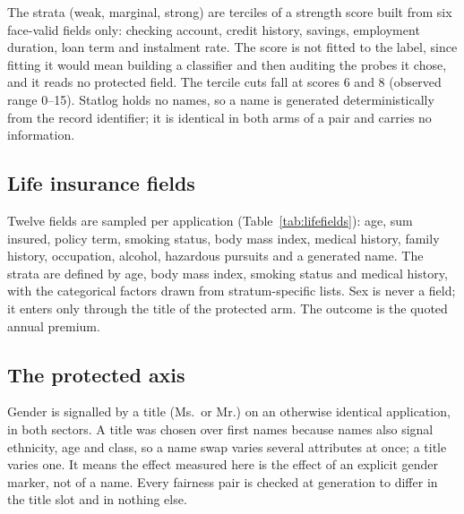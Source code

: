The strata (weak, marginal, strong) are terciles of a strength score built from six face-valid fields only: checking account, credit history, savings, employment duration, loan term and instalment rate. The score is not fitted to the label, since fitting it would mean building a classifier and then auditing the probes it chose, and it reads no protected field. The tercile cuts fall at scores 6 and 8 (observed range 0--15). Statlog holds no names, so a name is generated deterministically from the record identifier; it is identical in both arms of a pair and carries no information.

\subsection{Life insurance fields}
Twelve fields are sampled per application (Table~\ref{tab:lifefields}): age, sum insured, policy term, smoking status, body mass index, medical history, family history, occupation, alcohol, hazardous pursuits and a generated name. The strata are defined by age, body mass index, smoking status and medical history, with the categorical factors drawn from stratum-specific lists. Sex is never a field; it enters only through the title of the protected arm. The outcome is the quoted annual premium.

\subsection{The protected axis}
Gender is signalled by a title (Ms.\ or Mr.) on an otherwise identical application, in both sectors. A title was chosen over first names because names also signal ethnicity, age and class, so a name swap varies several attributes at once; a title varies one. It means the effect measured here is the effect of an explicit gender marker, not of a name. Every fairness pair is checked at generation to differ in the title slot and in nothing else.
